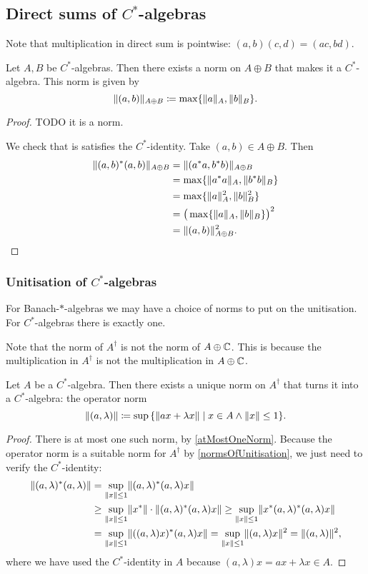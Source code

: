 \subsection{Direct sums of $C^*$-algebras}
Note that multiplication in direct sum is pointwise: $(a,b)(c,d) = (ac, bd)$.

\begin{proposition}
Let $A,B$ be $C^*$-algebras. Then there exists a norm on $A\oplus B$ that makes it a $C^*$-algebra. This norm is given by
\[ \lVert(a,b)\rVert_{A\oplus B} \coloneqq \max\{\lVert a\rVert_A, \lVert b\rVert_B\}. \]
\end{proposition}
\begin{proof}
TODO it is a norm.

We check that is satisfies the $C^*$-identity. Take $(a,b)\in A\oplus B$. Then
\begin{align*}
\lVert(a,b)^*(a,b)\rVert_{A\oplus B} &= \lVert(a^*a,b^*b)\rVert_{A\oplus B} \\
&= \max\{\lVert a^*a\rVert_A, \lVert b^*b\rVert_B\} \\
&= \max\{\lVert a\rVert_A^2, \lVert b\rVert_B^2\} \\
&= \big(\max\{\lVert a\rVert_A, \lVert b\rVert_B\}\big)^2 \\
&= \lVert(a,b)\rVert_{A\oplus B}^2.
\end{align*}
\end{proof}

\subsubsection{Unitisation of $C^*$-algebras}
For Banach-$*$-algebras we may have a choice of norms to put on the unitisation. For $C^*$-algebras there is exactly one.

Note that the norm of $A^\dagger$ is not the norm of $A\oplus \mathbb{C}$. This is because the multiplication in $A^\dagger$ is not the multiplication in $A\oplus \mathbb{C}$.
\begin{proposition}
Let $A$ be a $C^*$-algebra. Then there exists a unique norm on $A^\dagger$ that turns it into a $C^*$-algebra: the operator norm
\[ \norm{(a,\lambda)} \defeq \sup\setbuilder{\norm{ax + \lambda x}}{x\in A \land \norm{x}\leq 1} .\]
\end{proposition}
\begin{proof}
There is at most one such norm, by \ref{atMostOneNorm}. Because the operator norm is a suitable norm for $A^\dagger$ by \ref{normsOfUnitisation}, we just need to verify the $C^*$-identity:
\begin{align*}
\lVert(a,\lambda)^*(a,\lambda)\rVert &= \sup_{\lVert x\rVert\leq 1} \lVert(a,\lambda)^*(a,\lambda)x\rVert \\
&\geq \sup_{\lVert x\rVert\leq 1} \lVert x^*\rVert\cdot\lVert(a,\lambda)^*(a,\lambda)x\rVert \geq \sup_{\lVert x\rVert\leq 1} \lVert x^*(a,\lambda)^*(a,\lambda)x\rVert \\
&= \sup_{\lVert x\rVert\leq 1} \lVert((a,\lambda)x)^*(a,\lambda)x\rVert = \sup_{\lVert x\rVert\leq 1} \lVert(a,\lambda)x\rVert^2 = \lVert(a,\lambda)\rVert^2,
\end{align*}
where we have used the $C^*$-identity in $A$ because $(a,\lambda)x = ax + \lambda x \in A$.
\end{proof}

